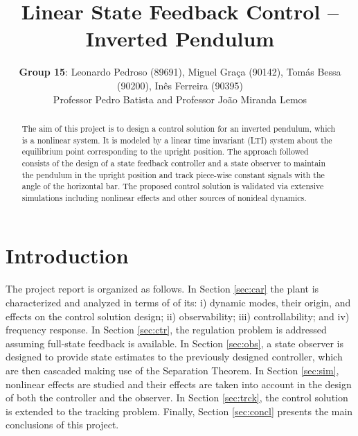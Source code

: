 \documentclass[letterpaper, 10 pt, conference]{ieeeconf}
\title{\LARGE \bf Linear State Feedback Control -- Inverted Pendulum}
\author{\textbf{Group 15}: Leonardo Pedroso (89691), Miguel Graça (90142), Tomás Bessa (90200), Inês Ferreira (90395)\\
Professor Pedro Batista and Professor João Miranda Lemos
}
\begin{document}
\maketitle
\pagestyle{empty}

\begin{abstract}
The aim of this project is to design a control solution for an inverted pendulum, which is a nonlinear system. It is modeled by a linear time invariant (LTI) system about the equilibrium point corresponding to the upright position. The approach followed consists of the design of a state feedback controller and a state observer to maintain the pendulum in the upright position and track piece-wise constant signals with the angle of the horizontal bar. The proposed control solution is validated via extensive simulations including nonlinear effects and other sources of nonideal dynamics.
\end{abstract}

\section{Introduction}
The project report is organized as follows. In Section \ref{sec:car} the plant is characterized and analyzed in terms of of its: i) dynamic modes, their origin, and effects on the control solution design; ii) observability; iii) controllability; and iv) frequency response. In Section \ref{sec:ctr}, the regulation problem is addressed assuming full-state feedback is available. In Section \ref{sec:obs}, a state observer is designed to provide state estimates to the previously designed controller, which are then cascaded making use of the Separation Theorem. In Section \ref{sec:sim}, nonlinear effects are studied and their effects are taken into account in the design of both the controller and the observer. In Section \ref{sec:trck}, the control solution is extended to the tracking problem. Finally, Section \ref{sec:concl} presents the main conclusions of this project.
\end{document}
